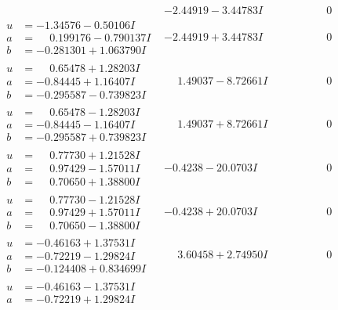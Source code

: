 \documentclass[1p]{elsarticle_modified}
\theoremstyle{definition}
\begin{document}
$$\begin{array}{c|c|c}
 & -2.44919 - 3.44783 I & \phantom{-0.000000 } 0 \\ \hline\begin{aligned}
u &= -1.34576 - 0.50106 I \\
a &= \phantom{-}0.199176 - 0.790137 I \\
b &= -0.281301 + 1.063790 I\end{aligned}
 & -2.44919 + 3.44783 I & \phantom{-0.000000 } 0 \\ \hline\begin{aligned}
u &= \phantom{-}0.65478 + 1.28203 I \\
a &= -0.84445 + 1.16407 I \\
b &= -0.295587 - 0.739823 I\end{aligned}
 & \phantom{-}1.49037 - 8.72661 I & \phantom{-0.000000 } 0 \\ \hline\begin{aligned}
u &= \phantom{-}0.65478 - 1.28203 I \\
a &= -0.84445 - 1.16407 I \\
b &= -0.295587 + 0.739823 I\end{aligned}
 & \phantom{-}1.49037 + 8.72661 I & \phantom{-0.000000 } 0 \\ \hline\begin{aligned}
u &= \phantom{-}0.77730 + 1.21528 I \\
a &= \phantom{-}0.97429 - 1.57011 I \\
b &= \phantom{-}0.70650 + 1.38800 I\end{aligned}
 & -0.4238 - 20.0703 I & \phantom{-0.000000 } 0 \\ \hline\begin{aligned}
u &= \phantom{-}0.77730 - 1.21528 I \\
a &= \phantom{-}0.97429 + 1.57011 I \\
b &= \phantom{-}0.70650 - 1.38800 I\end{aligned}
 & -0.4238 + 20.0703 I & \phantom{-0.000000 } 0 \\ \hline\begin{aligned}
u &= -0.46163 + 1.37531 I \\
a &= -0.72219 - 1.29824 I \\
b &= -0.124408 + 0.834699 I\end{aligned}
 & \phantom{-}3.60458 + 2.74950 I & \phantom{-0.000000 } 0 \\ \hline\begin{aligned}
u &= -0.46163 - 1.37531 I \\
a &= -0.72219 + 1.29824 I \\

\end{aligned}
\end{array}$$
\end{document}
